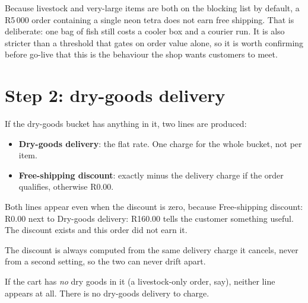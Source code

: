 \documentclass[11pt,a4paper,oneside]{report}
\newcommand{\R}[1]{R#1}
\begin{document}
\begin{housewarn}
Because livestock and very-large items are both on the blocking list by default, a
\R{5\,000} order containing a single neon tetra does not earn free shipping. That is
deliberate: one bag of fish still costs a cooler box and a courier run. It is also
stricter than a threshold that gates on order value alone, so it is worth confirming
before go-live that this is the behaviour the shop wants customers to meet.
\end{housewarn}

\section{Step 2: dry-goods delivery}

If the dry-goods bucket has anything in it, two lines are produced:

\begin{itemize}
  \item \textbf{Dry-goods delivery}: the flat rate. One charge for the whole bucket,
        not per item.
  \item \textbf{Free-shipping discount}: exactly minus the delivery charge if the
        order qualifies, otherwise \R{0.00}.
\end{itemize}

Both lines appear even when the discount is zero, because
\textsf{Free-shipping discount: R0.00} next to \textsf{Dry-goods delivery: R160.00}
tells the customer something useful. The discount exists and this order did not
earn it.

The discount is always computed from the same delivery charge it cancels, never from
a second setting, so the two can never drift apart.

If the cart has \emph{no} dry goods in it (a livestock-only order, say), neither
line appears at all. There is no dry-goods delivery to charge.
\end{document}

